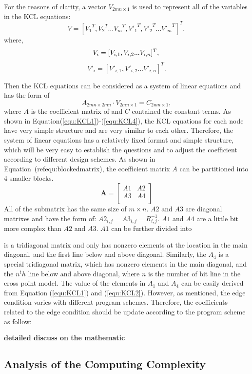 For the reasons of clarity, a vector ${V}_{2mn\times 1}$ is used to represent all of the variables in the KCL equations:
\begin{equation}\label{equ:V1}
{V}=[{V_1}^T,{V_2}^T...{V_m}^T,{V'_1}^T,{V'_2}^T...{V'_m}^T]^T,
\end{equation}
where,
\begin{equation}\label{equ:V2}
{V_i} = [V_{i,1},V_{i,2}...V_{i,n}]^T,\\
\end{equation}
\begin{equation}\label{equ:V3}
{V'_i} = [V'_{i,1},V'_{i,2}...V'_{i,n}]^T.
\end{equation}

Then the KCL equations can be considered as a system of linear equations and has the form of 
\begin{equation}\label{equ:matrix}
A_{2mn\times{2mn}}\cdot V_{2mn\times{1}} = C_{2mn\times{1}},
\end{equation}
where $A$ is the coefficient matrix of and $C$ contained the constant terms. As shown in Equation(\ref{equ:KCL1})-(\ref{equ:KCL4}), the KCL equations for each node have very simple structure and are very similar to each other. Therefore, the system of linear equations has a relatively fixed format and simple structure, which will be very easy to establish the questions and to adjust the coefficient according to different design schemes. As shown in Equation~(ref{equ:blockedmatrix}), the coefficient matrix $A$ can be partitioned into 4 smaller blocks. 
\begin{equation}\label{equ:blockedmatrix}
    \mathbf{A} = \left[
    \begin{array}{cc}
        A1 & A2  \\
        A3 & A4  \\
    \end{array} \right]
\end{equation}
All of the submatrix has the same size of $m\times n$. $A2$ and $A3$ are diagonal matrixes and have the form of: $A2_{i,j} = A3_{i,j} = R_{i,j}^{-1}$. $A1$ and $A4$ are a little bit more complex than $A2$ and $A3$. $A1$ can be further divided into 


is a tridiagonal matrix and only has nonzero elements at the location in the main diagonal, and the first line below and above diagonal. Similarly, the $A_4$ is a special tridiagonal matrix, which has nonzero elements in the main diagonal, and the $n^th$ line below and above diagonal, where $n$ is the number of bit line in the cross point model.
The value of the elements in $A_1$ and $A_4$ can be easily derived from Equation (\ref{equ:KCL1}) and (\ref{equ:KCL2}). However, as mentioned, the edge condition varies with different program schemes. Therefore, the coefficients related to the edge condition should be update according to the program scheme as follow:
  
\textbf{detailed discuss on the mathematic}

\subsection{Analysis of the Computing Complexity}
